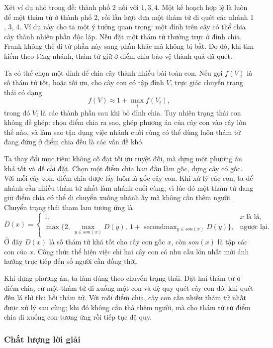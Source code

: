 \documentclass[11pt]{article}
\begin{document}
Xét ví dụ nhỏ trong đề: thành phố \(2\) nối với \(1,3,4\). Một kế hoạch hợp
lệ là luôn để một thám tử ở thành phố \(2\), rồi lần lượt đưa một thám tử đi
quét các nhánh \(1\), \(3\), \(4\). Ví dụ này cho ta một ý tưởng quan trọng:
một đỉnh trên cây có thể chia cây thành nhiều phần độc lập. Nếu đặt một thám
tử thường trực ở đỉnh chia, Frank không thể đi từ phần này sang phần khác
mà không bị bắt. Do đó, khi tìm kiếm theo từng nhánh, thám tử giữ ở điểm
chia bảo vệ thành quả đã quét.

Ta có thể chọn một đỉnh để chia cây thành nhiều bài toán con. Nếu gọi
\(f(V)\) là số thám tử tốt, hoặc tối ưu, cho cây con có tập đỉnh \(V\), trực
giác chuyển trạng thái có dạng
\[
  f(V) \approx 1 + \max_i f(V_i),
\]
trong đó \(V_i\) là các thành phần sau khi bỏ đỉnh chia. Tuy nhiên trạng
thái con không dễ ghép: chọn điểm chia ra sao, ghép phương án của cây con
vào cây lớn thế nào, và làm sao tận dụng việc nhánh cuối cùng có thể dùng
luôn thám tử đang đứng ở điểm chia đều là các vấn đề khó.

Ta thay đổi mục tiêu: không cố đạt tối ưu tuyệt đối, mà dựng một phương án
khá tốt và dễ cài đặt. Chọn một điểm chia ban đầu làm gốc, dựng cây có gốc.
Với mỗi cây con, điểm chia được lấy luôn là gốc cây con. Khi xử lý các con,
ta để nhánh cần nhiều thám tử nhất làm nhánh cuối cùng, vì lúc đó một thám tử
đang giữ điểm chia có thể di chuyển xuống nhánh ấy mà không cần thêm người.
Chuyển trạng thái tham lam tương ứng là
\[
  D(x)=
  \begin{cases}
    1, & x \text{ là lá},\\
    \max\{2,\ \max_{y\in son(x)}D(y),\ 1+\operatorname{secondmax}_{y\in son(x)}D(y)\},
       & \text{ngược lại}.
  \end{cases}
\]
Ở đây \(D(x)\) là số thám tử khá tốt cho cây con gốc \(x\), còn
\(son(x)\) là tập các con của \(x\). Công thức thể hiện việc chỉ hai cây con
có nhu cầu lớn nhất mới ảnh hưởng trực tiếp đến số người cần đồng thời.

Khi dựng phương án, ta làm đúng theo chuyển trạng thái. Đặt hai thám tử ở
điểm chia, cử một thám tử đi xuống một con và đệ quy quét cây con đó; khi
quét đến lá thì thu hồi thám tử. Với mỗi điểm chia, cây con cần nhiều thám
tử nhất được xử lý sau cùng; khi đó không cần thả thêm người, mà cho thám tử
từ điểm chia đi xuống con tương ứng rồi tiếp tục đệ quy.

\subsubsection{Chất lượng lời giải}
\end{document}
